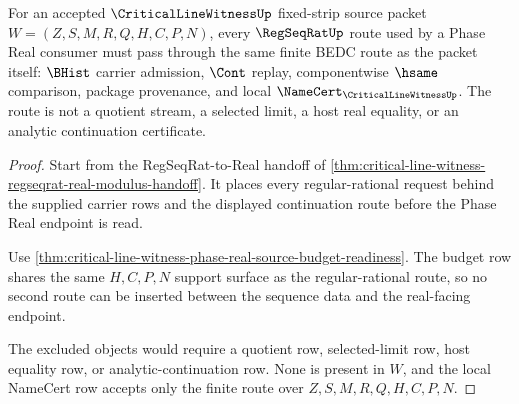 \begin{theorem}
\label{thm:critical-line-witness-phase-real-regseqrat-route-readiness}
For an accepted $\CriticalLineWitnessUp$ fixed-strip source packet $W=(Z,S,M,R,Q,H,C,P,N)$, every $\RegSeqRatUp$ route used by a Phase Real consumer must pass through the same finite BEDC route as the packet itself: $\BHist$ carrier admission, $\Cont$ replay, componentwise $\hsame$ comparison, package provenance, and local $\NameCert_{\CriticalLineWitnessUp}$. The route is not a quotient stream, a selected limit, a host real equality, or an analytic continuation certificate.
\end{theorem}
\begin{proof}
Start from the RegSeqRat-to-Real handoff of \autoref{thm:critical-line-witness-regseqrat-real-modulus-handoff}. It places every regular-rational request behind the supplied carrier rows and the displayed continuation route before the Phase Real endpoint is read.

Use \autoref{thm:critical-line-witness-phase-real-source-budget-readiness}. The budget row shares the same $H,C,P,N$ support surface as the regular-rational route, so no second route can be inserted between the sequence data and the real-facing endpoint.

The excluded objects would require a quotient row, selected-limit row, host equality row, or analytic-continuation row. None is present in $W$, and the local NameCert row accepts only the finite route over $Z,S,M,R,Q,H,C,P,N$.
\end{proof}

